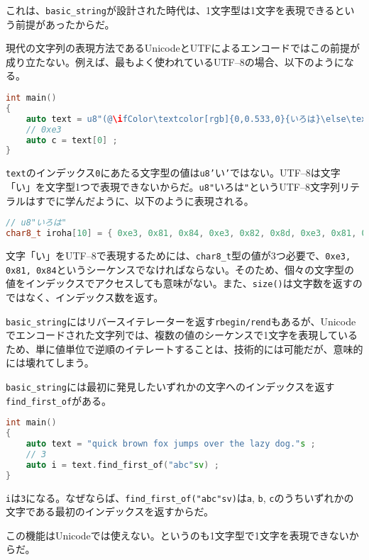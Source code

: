 これは、\texttt{basic\_string}が設計された時代は、1文字型は1文字を表現できるという前提があったからだ。

現代の文字列の表現方法であるUnicodeとUTFによるエンコードではこの前提が成り立たない。例えば、最もよく使われているUTF--8の場合、以下のようになる。

\begin{lstlisting}[language={C++}]
int main()
{
    auto text = u8"(@\ifColor\textcolor[rgb]{0,0.533,0}{いろは}\else\textcolor{black}{いろは}\fi@)"s ;
    // 0xe3
    auto c = text[0] ;
}
\end{lstlisting}

\texttt{text}のインデックス\texttt{0}にあたる文字型の値は\texttt{u8'}\textsf{い}\texttt{'}ではない。UTF--8は文字「い」を文字型1つで表現できないからだ。\texttt{u8"}\textsf{いろは}\texttt{"}というUTF--8文字列リテラルはすでに学んだように、以下のように表現される。

\begin{lstlisting}[language={C++}]
// u8"いろは"
char8_t iroha[10] = { 0xe3, 0x81, 0x84, 0xe3, 0x82, 0x8d, 0xe3, 0x81, 0xaf, 0x0 } ;
\end{lstlisting}

文字「い」をUTF--8で表現するためには、\texttt{char8\_t}型の値が3つ必要で、\texttt{0xe3, 0x81, 0x84}というシーケンスでなければならない。そのため、個々の文字型の値をインデックスでアクセスしても意味がない。また、\texttt{size()}は文字数を返すのではなく、インデックス数を返す。

\texttt{basic\_string}にはリバースイテレーターを返す\texttt{rbegin/rend}もあるが、Unicodeでエンコードされた文字列では、複数の値のシーケンスで1文字を表現しているため、単に値単位で逆順のイテレートすることは、技術的には可能だが、意味的には壊れてしまう。

\texttt{basic\_string}には最初に発見したいずれかの文字へのインデックスを返す\texttt{find\_first\_of}がある。

\ifTombow\pagebreak\fi
\begin{lstlisting}[language={C++}]
int main()
{
    auto text = "quick brown fox jumps over the lazy dog."s ;
    // 3
    auto i = text.find_first_of("abc"sv) ;
}
\end{lstlisting}

\texttt{i}は\texttt{3}になる。なぜならば、\texttt{find\_first\_of("abc"sv)}は\texttt{a}, \texttt{b}, \texttt{c}のうちいずれかの文字である最初のインデックスを返すからだ。

この機能はUnicodeでは使えない。というのも1文字型で1文字を表現できないからだ。

